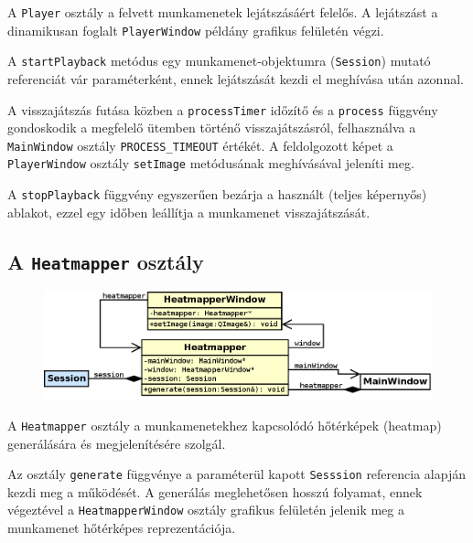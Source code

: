 A \texttt{Player} osztály a felvett munkamenetek lejátszásáért felelős. A lejátszást a dinamikusan foglalt \texttt{PlayerWindow} példány grafikus felületén végzi.

A \texttt{startPlayback} metódus egy munkamenet-objektumra (\texttt{Session}) mutató referenciát vár paraméterként, ennek lejátszását kezdi el meghívása után azonnal.

A visszajátszás futása közben a \texttt{processTimer} időzítő és a \texttt{process} függvény gondoskodik a megfelelő ütemben történő visszajátszásról, felhasználva a \texttt{MainWindow} osztály \texttt{PROCESS\_TIMEOUT} értékét. A feldolgozott képet a \texttt{PlayerWindow} osztály \texttt{setImage} metódusának meghívásával jeleníti meg.

A \texttt{stopPlayback} függvény egyszerűen bezárja a használt (teljes képernyős) ablakot, ezzel egy időben leállítja a munkamenet visszajátszását.

\subsection{A \texttt{Heatmapper} osztály}\label{sect:heatmapper}

\begin{figure}[!ht]
\centering
\includegraphics[width=140mm, keepaspectratio]{figures/class_heatmapper.png}
\end{figure}

A \texttt{Heatmapper} osztály a munkamenetekhez kapcsolódó hőtérképek (heatmap) generálására és megjelenítésére szolgál.

Az osztály \texttt{generate} függvénye a paraméterül kapott \texttt{Sesssion} referencia alapján kezdi meg a működését. A generálás meglehetősen hosszú folyamat, ennek végeztével a \texttt{HeatmapperWindow} osztály grafikus felületén jelenik meg a munkamenet hőtérképes reprezentációja.

